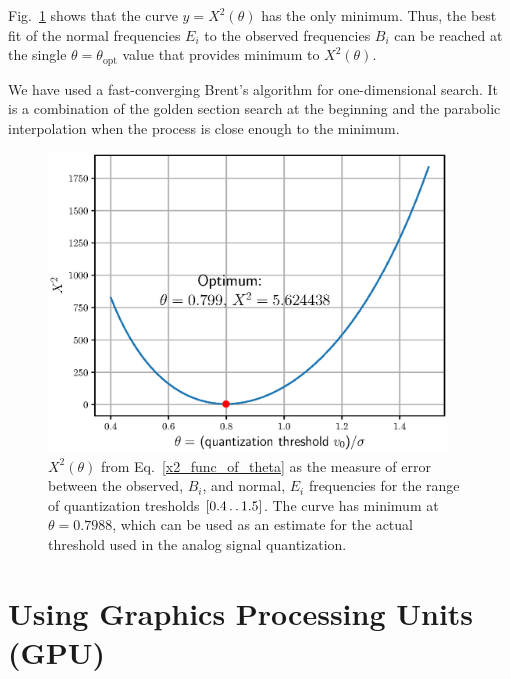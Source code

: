 \documentclass[letterpaper,twoside,12pt]{article}
\begin{document}
Fig.~\ref{optimum_theta} shows that the curve $y = X^2(\theta)$ has the only minimum. Thus, the best fit of the normal frequencies $E_i$ to the observed frequencies $B_i$ can be reached at the single $\theta=\theta_\text{opt}$ value that provides minimum to $X^2(\theta)$. 

We have used a fast-converging Brent's algorithm for one-dimensional search. It is a combination of the golden section search at the beginning and the parabolic interpolation when the process is close enough to the minimum.


\begin{figure}[ht!]
  \begin{center}
  \includegraphics[width=25pc]{fig_optimal_quantization_threshold.eps}
  \caption{\small $X^2(\theta)$ from Eq.~\eqref{x2_func_of_theta} as the measure of error between the observed, $B_i$, and normal, $E_i$ frequencies for the range of quantization tresholds $[0.4 \mathinner{\ldotp\ldotp}1.5]$. The curve has minimum at $\theta = 0.7988$, which can be used as an estimate for the actual threshold used in the analog signal quantization.}
  \label{optimum_theta}
  \end{center}
\end{figure}


\section{Using Graphics Processing Units (GPU)}



\end{document}

